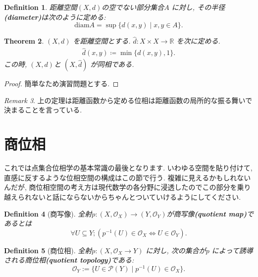 \documentclass[lualatex]{ltjsbook}
\newtheorem{theorem}{Theorem}[chapter]
\newtheorem{definition}[theorem]{Definition}
\theoremstyle{remark}
\newtheorem{remark}[theorem]{Remark}
\theoremstyle{plain}
\begin{document}
\begin{definition}
	距離空間$\left( X , d \right) $の空でない部分集合$A$ に対し,  その半径\textbf{(diameter)}は次のように定める:
	\[
		\mathrm{diam}A= \sup \{d(x, y)  \mid x, y \in A\} 
	.\] 
\end{definition}

\begin{theorem}
	$\left( X, d \right) $ を距離空間とする. $ \hat{d}: X \times X \to \mathbb{R} $ を次に定める.
  \begin{equation}
    \begin{aligned}
      \hat{d}(x,y) \coloneqq \min \{d(x,y) ,1\} .
    \end{aligned}
  \end{equation} 
この時, $(X,d) $と $(X,\hat{d})$ が同相である. 
\end{theorem}
\begin{proof}
  簡単なため演習問題とする. 
\end{proof}

\begin{remark}
  上の定理は距離函数から定める位相は距離函数の局所的な振る舞いで決まることを言っている. 
\end{remark}
\section{商位相}

これでは点集合位相学の基本常識の最後となります.
いわゆる空間を貼り付けて,  直感に反するような位相空間の構成はこの節で行う.
複雑に見えるかもしれないんだが,  商位相空間の考え方は現代数学の各分野に浸透したのでこの部分を乗り越えられないと話にならないからちゃんとついていけるようにしてください. 

\begin{definition}[商写像]
	全射$p: \left( X,  \mathcal{O}_X \right) \to \left( Y,  \mathcal{O}_Y \right)  $が商写像\textbf{(quotient map)}であるとは
	\[
	\forall U \subseteq Y;\left( p^{-1}\left( U \right) \in \mathcal{O}_X \iff U \in \mathcal{O}_Y \right) 
	.\] 
\end{definition}

\begin{definition}[商位相]
	全射$p:\left( X, \mathcal{O}_X \to Y \right) $ に対し,  次の集合が$p$ によって誘導される商位相\textbf{(quotient topology)}である:
	\[
	\mathcal{O}_Y := \{U \in \mathcal{P}\left( Y \right)  \mid p^{-1}\left( U \right)  \in \mathcal{O}_X \} 
	.\] 
	
\end{definition}
\end{document}
